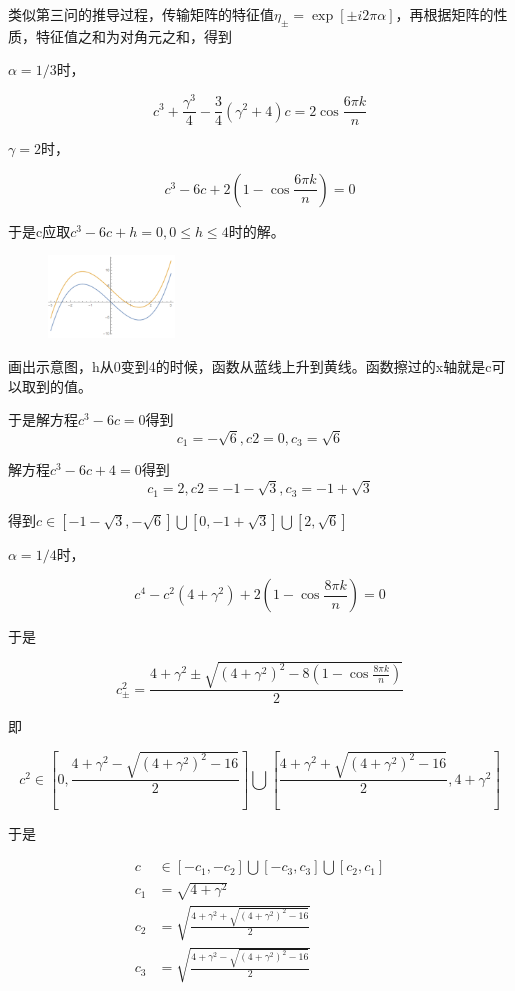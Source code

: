 \documentclass[10pt, a4paper]{article}
\begin{document}
    类似第三问的推导过程，传输矩阵的特征值$\eta_\pm=\exp[\pm i 2\pi \alpha]$，再根据矩阵的性质，特征值之和为对角元之和，得到

    $\alpha=1/3$时，

    \[c^3+\frac{\gamma ^3}{4}-\frac{3}{4} (\gamma ^2+4) c=2\cos\frac{6\pi k}{n}\]

    $\gamma=2$时，

    \[c^3-6c+2(1-\cos\frac{6\pi k}{n})=0\]

    于是c应取$c^3-6c+h=0,0\leq h\leq 4$时的解。

    \begin{figure}[H]
        \centering
        \includegraphics[width=0.3\textwidth]{q4-a=0.33解析计算示意图.png}
    \end{figure}

    画出示意图，h从0变到4的时候，函数从蓝线上升到黄线。函数擦过的x轴就是c可以取到的值。

    于是解方程$c^3-6c=0$得到
    \[c_1=-\sqrt{6},c2=0,c_3=\sqrt{6}\]
    
    解方程$c^3-6c+4=0$得到
    \[c_1=2,c2=-1-\sqrt{3},c_3=-1+\sqrt{3}\]

    得到$c\in[-1-\sqrt{3},-\sqrt{6}]\bigcup[0,-1+\sqrt{3}]\bigcup[2,\sqrt{6}]$

    $\alpha=1/4$时，

    \[c^4-c^2(4+\gamma^2)+2(1-\cos\frac{8\pi k}{n})=0\]

    于是

    \[c^2_\pm=\frac{4+\gamma^2\pm\sqrt{(4+\gamma^2)^2-8(1-\cos\frac{8\pi k}{n})}}{2}\]

    即

    \[c^2\in[0,\frac{4+\gamma^2-\sqrt{(4+\gamma^2)^2-16}}{2}]\bigcup[\frac{4+\gamma^2+\sqrt{(4+\gamma^2)^2-16}}{2},4+\gamma^2]\]

    于是

    \begin{align*}
        c&\in[-c_1,-c_2]\bigcup[-c_3,c_3]\bigcup[c_2,c_1]\\
        c_1&=\sqrt{4+\gamma^2}\\
        c_2&=\sqrt{\frac{4+\gamma^2+\sqrt{(4+\gamma^2)^2-16}}{2}}\\
        c_3&=\sqrt{\frac{4+\gamma^2-\sqrt{(4+\gamma^2)^2-16}}{2}}
    \end{align*}
\end{document}
